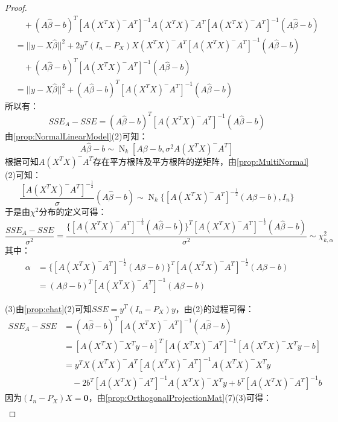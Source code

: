 \begin{proof}
\begin{align*}
		&\quad+(A\hat{\beta}-b)^T[A(X^TX)^-A^T]^{-1}A(X^TX)^-A^T[A(X^TX)^-A^T]^{-1}(A\hat{\beta}-b) \\
		&=||y-X\hat{\beta}||^2+2y^T(I_n-P_X)X(X^TX)^-A^T[A(X^TX)^-A^T]^{-1}(A\hat{\beta}-b) \\
		&\quad+(A\hat{\beta}-b)^T[A(X^TX)^-A^T]^{-1}(A\hat{\beta}-b) \\
		&=||y-X\hat{\beta}||^2+(A\hat{\beta}-b)^T[A(X^TX)^-A^T]^{-1}(A\hat{\beta}-b)
	\end{align*}
	所以有：
	\begin{equation*}
		SSE_A-SSE=(A\hat{\beta}-b)^T[A(X^TX)^-A^T]^{-1}(A\hat{\beta}-b)
	\end{equation*}
	由\cref{prop:NormalLinearModel}(2)可知：
	\begin{equation*}
		A\hat{\beta}-b\sim\operatorname{N}_k[A\beta-b,\sigma^2A(X^TX)^-A^T]
	\end{equation*}
	根据可知$A(X^TX)^-A^T$存在平方根阵及平方根阵的逆矩阵，由\cref{prop:MultiNormal}(2)可知：
	\begin{equation*}
		\frac{[A(X^TX)^-A^T]^{-\frac{1}{2}}}{\sigma}(A\hat{\beta}-b)\sim\operatorname{N}_k\{[A(X^TX)^-A^T]^{-\frac{1}{2}}(A\beta-b),I_n\}
	\end{equation*}
	于是由$\chi^2$分布的定义可得：
	\begin{equation*}
		\frac{SSE_A-SSE}{\sigma^2}=\frac{\{[A(X^TX)^-A^T]^{-\frac{1}{2}}(A\hat{\beta}-b)\}^T[A(X^TX)^-A^T]^{-\frac{1}{2}}(A\hat{\beta}-b)}{\sigma^2}\sim\chi_{k,\alpha}^2
	\end{equation*}
	其中：
	\begin{align*}
		\alpha&=\{[A(X^TX)^-A^T]^{-\frac{1}{2}}(A\beta-b)\}^T[A(X^TX)^-A^T]^{-\frac{1}{2}}(A\beta-b) \\
		&=(A\beta-b)^T[A(X^TX)^-A^T]^{-1}(A\beta-b)
	\end{align*}\par
	(3)由\cref{prop:ehat}(2)可知$SSE=y^T(I_n-P_X)y$，由(2)的过程可得：
	\begin{align*}
		SSE_A-SSE&=(A\hat{\beta}-b)^T[A(X^TX)^-A^T]^{-1}(A\hat{\beta}-b) \\
		&=[A(X^TX)^-X^Ty-b]^T[A(X^TX)^-A^T]^{-1}[A(X^TX)^-X^Ty-b] \\
		&=y^TX(X^TX)^-A^T[A(X^TX)^-A^T]^{-1}A(X^TX)^-X^Ty \\
		&\quad-2b^T[A(X^TX)^-A^T]^{-1}A(X^TX)^-X^Ty+b^T[A(X^TX)^-A^T]^{-1}b
	\end{align*}
	因为$(I_n-P_X)X=\mathbf{0}$，由\cref{prop:OrthogonalProjectionMat}(7)(3)可得：
	\begin{gather*}

\end{gather*}
\end{proof}
